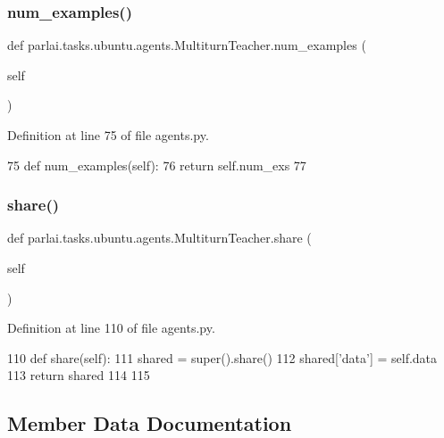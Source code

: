 \subsubsection{\texorpdfstring{num\+\_\+examples()}{num\_examples()}}
{\footnotesize\ttfamily def parlai.\+tasks.\+ubuntu.\+agents.\+Multiturn\+Teacher.\+num\+\_\+examples (\begin{DoxyParamCaption}\item[{}]{self }\end{DoxyParamCaption})}



Definition at line 75 of file agents.\+py.


\begin{DoxyCode}
75     \textcolor{keyword}{def }num\_examples(self):
76         \textcolor{keywordflow}{return} self.num\_exs
77 
\end{DoxyCode}
\mbox{\label{classparlai_1_1tasks_1_1ubuntu_1_1agents_1_1MultiturnTeacher_a4d2d163664a969a28ba9171f5d2a5ce7}} 
\subsubsection{\texorpdfstring{share()}{share()}}
{\footnotesize\ttfamily def parlai.\+tasks.\+ubuntu.\+agents.\+Multiturn\+Teacher.\+share (\begin{DoxyParamCaption}\item[{}]{self }\end{DoxyParamCaption})}



Definition at line 110 of file agents.\+py.


\begin{DoxyCode}
110     \textcolor{keyword}{def }share(self):
111         shared = super().share()
112         shared[\textcolor{stringliteral}{'data'}] = self.data
113         \textcolor{keywordflow}{return} shared
114 
115 
\end{DoxyCode}


\subsection{Member Data Documentation}
\mbox{\label{classparlai_1_1tasks_1_1ubuntu_1_1agents_1_1MultiturnTeacher_a0746041b61b1174f04efa5e19c6ec55d}} 
